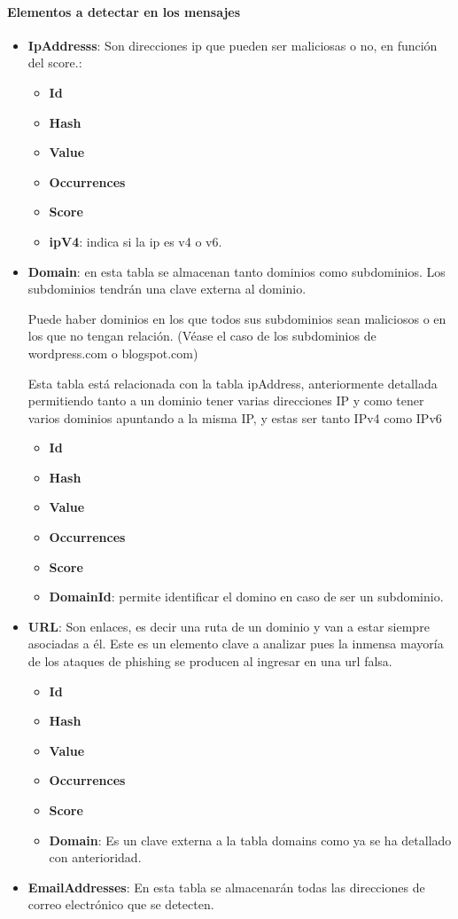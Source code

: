 \paragraph{Elementos a detectar en los mensajes}
\begin{itemize}
    \item \textbf{IpAddresss}: Son direcciones ip que pueden ser maliciosas o no, en función del score.: 
\begin{itemize}
    \item \textbf{Id}
    \item \textbf{Hash}
    \item \textbf{Value}
    \item \textbf{Occurrences}
    \item \textbf{Score}
    \item \textbf{ipV4}: indica si la ip es v4 o v6.
\end{itemize}
\item \textbf{Domain}: en esta tabla se almacenan tanto dominios como subdominios. Los subdominios tendrán una clave externa al dominio. 

Puede haber dominios en los que todos sus subdominios sean maliciosos o en los que no tengan relación. (Véase el caso de los subdominios de wordpress.com o blogspot.com)

Esta tabla está relacionada con la tabla ipAddress, anteriormente detallada permitiendo tanto a un dominio tener varias direcciones IP y como tener varios dominios apuntando a la misma IP, y estas ser tanto IPv4 como IPv6

\begin{itemize}
    \item \textbf{Id}
    \item \textbf{Hash}
    \item \textbf{Value}
    \item \textbf{Occurrences}
    \item \textbf{Score}
    \item \textbf{DomainId}: permite identificar el domino en caso de ser un subdominio.
\end{itemize}
\item \textbf{URL}: Son enlaces, es decir una ruta de un dominio y van a estar siempre asociadas a él. Este es un elemento clave a analizar pues la inmensa mayoría de los ataques de phishing se producen al ingresar en una url falsa.
\begin{itemize}
    \item \textbf{Id}
    \item \textbf{Hash}
    \item \textbf{Value}
    \item \textbf{Occurrences}
    \item \textbf{Score}
    \item \textbf{Domain}: Es un clave externa a la tabla domains como ya se ha detallado con anterioridad.
\end{itemize}
\item \textbf{EmailAddresses}: En esta tabla se almacenarán todas las direcciones de correo electrónico que se detecten. 


\end{itemize}
